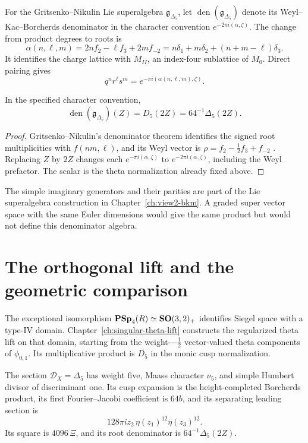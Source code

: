 For the Gritsenko--Nikulin Lie superalgebra
\(\mathfrak g_{\Delta_5}\), let
\(\operatorname{den}(\mathfrak g_{\Delta_5})\) denote its
Weyl--Kac--Borcherds denominator in the character convention
\(e^{-2\pi i(\alpha,\zeta)}\).
The change from product degrees to roots is
\[
 \alpha(n,\ell,m)=2nf_2-\ell f_3+2mf_{-2}
 =n\delta_1+m\delta_2+(n+m-\ell)\delta_3.
\]
It identifies the charge lattice with \(M_{II}\), an index-four
sublattice of \(M_0\).  Direct pairing gives
\[
 q^nr^\ell s^m=e^{-\pi i(\alpha(n,\ell,m),\zeta)}.
\]

\begin{proposition}
\label{prop:view1-GN-doubled-denominator}
In the specified character convention,
\[
 \operatorname{den}(\mathfrak g_{\Delta_5})(Z)
 =D_5(2Z)=64^{-1}\Delta_5(2Z).
\]
\end{proposition}

\begin{proof}
Gritsenko--Nikulin's denominator theorem identifies the signed root
multiplicities with \(f(nm,\ell)\), and its Weyl vector is
\(\rho=f_2-\tfrac12f_3+f_{-2}\)
\cite[\S3 and Theorem 4.1]{GN}.
Replacing \(Z\) by \(2Z\) changes each
\(e^{-\pi i(\alpha,\zeta)}\) to
\(e^{-2\pi i(\alpha,\zeta)}\), including the Weyl prefactor.
The scalar is the theta normalization already fixed above.
\end{proof}

The simple imaginary generators and their parities are part of the
Lie superalgebra construction in Chapter~\ref{ch:view2-bkm}.
A graded super vector space with the same Euler dimensions would
give the same product but would not define this denominator algebra.

\section{The orthogonal lift and the geometric comparison}
\label{sec:view1-Sp-Spin-bridge}
\label{sec:view1-summary}

The exceptional isomorphism
\(\mathbf{PSp}_4(R)\simeq\mathbf{SO}(3,2)_+\) identifies Siegel space with a
type-IV domain.  Chapter~\ref{ch:singular-theta-lift} constructs the
regularized theta lift on that domain, starting from the
weight-\(-\tfrac12\) vector-valued theta components of
\(\phi_{0,1}\).  Its multiplicative product is \(D_5\) in the
monic cusp normalization.

\begin{theorem}
\label{thm:view1-package}
The section \(\mathcal D_X=\Delta_5\) has weight five,
Maass character \(\nu_5\), and simple Humbert divisor of
discriminant one.  Its cusp expansion is the height-completed
Borcherds product, its first Fourier--Jacobi coefficient is \(64b\),
and its separating leading section is
\[
 128\pi iz_2\,\eta(z_1)^{12}\eta(z_3)^{12}.
\]
Its square is \(4096\,\Xi\), and its root denominator is
\(64^{-1}\Delta_5(2Z)\).
\end{theorem}

